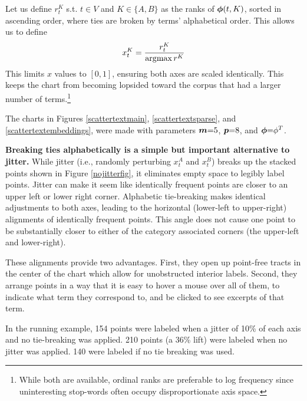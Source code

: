 \documentclass[11pt,a4paper]{article}
\begin{document}
Let us define $r^{K}_t$ s.t. $t \in V$ and $K \in \{A,B\}$ as the ranks of $\mbox{\boldmath$\phi$}(t,K)$, sorted in ascending order, where ties are broken by terms' alphabetical order.  This allows us to define \vspace{-.2cm}
\begin{equation}
\vspace{-.2cm}
x^{K}_t = \frac{r^{K}_t}{\arg\!\max r^{K}}
\end{equation}
This limits $x$ values to $[0,1]$, ensuring both axes are scaled identically.  This keeps the chart from becoming lopsided toward the corpus that had a larger number of terms.\footnote{While both are available, ordinal ranks are preferable to log frequency since uninteresting stop-words often occupy disproportionate axis space.} 

The charts in Figures \ref{scattertextmain}, \ref{scattertextsparse}, and \ref{scattertextembeddings}, were made with parameters $\mbox{\boldmath$m$}{=}5$, $\mbox{\boldmath$p$}{=}8$, and $\mbox{\boldmath$\phi$}{=}\phi^{T}$. 

\textbf{Breaking ties alphabetically is a simple but important alternative to jitter.} While jitter (i.e., randomly perturbing $x_{t}^{A}$ and $x_{t}^{B}$) breaks up the stacked points shown in Figure \ref{nojitterfig}, it eliminates empty space to legibly label points.  Jitter can make it seem like identically frequent points are closer to an upper left or lower right corner.  Alphabetic tie-breaking makes identical adjustments to both axes, leading to the horizontal (lower-left to upper-right) alignments of identically frequent points.  This angle does not cause one point to be substantially closer to either of the category associated corners (the upper-left and lower-right). 

These alignments provide two advantages. First, they open up point-free tracts in the center of the chart which allow for unobstructed interior labels. Second, they arrange points in a way that it is easy to hover a mouse over all of them, to indicate what term they correspond to, and be clicked to see excerpts of that term.

In the running example, 154 points were labeled when a jitter of 10\% of each axis and no tie-breaking was applied. 210 points (a 36\% lift) were labeled when no jitter was applied. 140 were labeled if no tie breaking was used.
\end{document}
